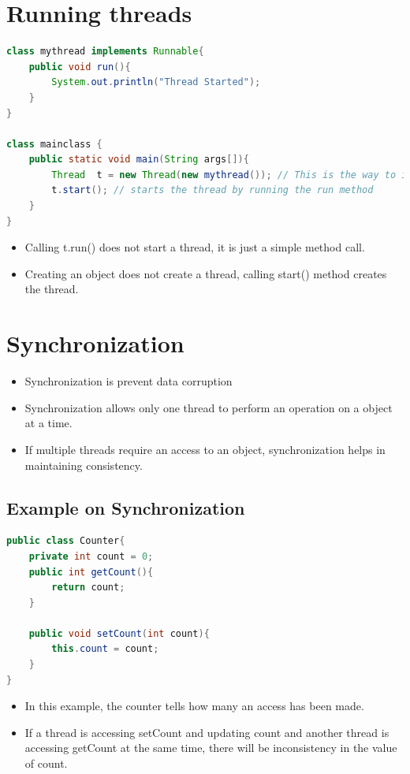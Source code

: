 \documentclass[12pt, a4paper]{book}
\begin{document}
\section{Running threads}
\begin{lstlisting}[language=java]
class mythread implements Runnable{
    public void run(){
        System.out.println("Thread Started");
    }
}

class mainclass {
    public static void main(String args[]){
        Thread  t = new Thread(new mythread()); // This is the way to instantiate a 					 thread implementing runnable interface
        t.start(); // starts the thread by running the run method
    }
}
\end{lstlisting}
\begin{itemize}
    \item Calling t.run() does not start a thread, it is just a simple method call.
    \item Creating an object does not create a thread, calling start() method creates the thread.
\end{itemize}

\section{Synchronization}
\begin{itemize}
    \item Synchronization is prevent data corruption
    \item Synchronization allows only one thread to perform an operation on a object at a time.
    \item If multiple threads require an access to an object, synchronization helps in maintaining consistency.
\end{itemize}
\subsection{Example on Synchronization}
\begin{lstlisting}[language=java]
public class Counter{
    private int count = 0;
    public int getCount(){
        return count;
    }

    public void setCount(int count){
        this.count = count;
    }
}
\end{lstlisting}
\begin{itemize}
    \item In this example, the counter tells how many an access has been made.
    \item If a thread is accessing setCount and updating count and another thread is accessing getCount at the same time, there will be inconsistency in the value of count.
\end{itemize}
\end{document}
